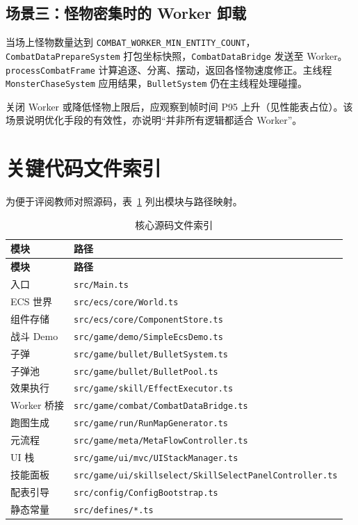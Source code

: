 \subsection{场景三：怪物密集时的 Worker 卸载}

当场上怪物数量达到 \texttt{COMBAT\_WORKER\_MIN\_ENTITY\_COUNT}，\texttt{CombatDataPrepareSystem} 打包坐标快照，\texttt{CombatDataBridge} 发送至 Worker。\texttt{processCombatFrame} 计算追逐、分离、摆动，返回各怪物速度修正。主线程 \texttt{MonsterChaseSystem} 应用结果，\texttt{BulletSystem} 仍在主线程处理碰撞。

关闭 Worker 或降低怪物上限后，应观察到帧时间 P95 上升（见性能表占位）。该场景说明优化手段的有效性，亦说明“并非所有逻辑都适合 Worker”。

\section{关键代码文件索引}

为便于评阅教师对照源码，表~\ref{tab:file-index} 列出模块与路径映射。

\begin{longtable}{p{3.5cm}p{9cm}}
  \caption{核心源码文件索引} \label{tab:file-index} \\
  \toprule
  \textbf{模块} & \textbf{路径} \\
  \midrule
  \endfirsthead
  \toprule
  \textbf{模块} & \textbf{路径} \\
  \midrule
  \endhead
  入口 & \texttt{src/Main.ts} \\
  ECS 世界 & \texttt{src/ecs/core/World.ts} \\
  组件存储 & \texttt{src/ecs/core/ComponentStore.ts} \\
  战斗 Demo & \texttt{src/game/demo/SimpleEcsDemo.ts} \\
  子弹 & \texttt{src/game/bullet/BulletSystem.ts} \\
  子弹池 & \texttt{src/game/bullet/BulletPool.ts} \\
  效果执行 & \texttt{src/game/skill/EffectExecutor.ts} \\
  Worker 桥接 & \texttt{src/game/combat/CombatDataBridge.ts} \\
  跑图生成 & \texttt{src/game/run/RunMapGenerator.ts} \\
  元流程 & \texttt{src/game/meta/MetaFlowController.ts} \\
  UI 栈 & \texttt{src/game/ui/mvc/UIStackManager.ts} \\
  技能面板 & \texttt{src/game/ui/skillselect/SkillSelectPanelController.ts} \\
  配表引导 & \texttt{src/config/ConfigBootstrap.ts} \\
  静态常量 & \texttt{src/defines/*.ts} \\
  \bottomrule
\end{longtable}

